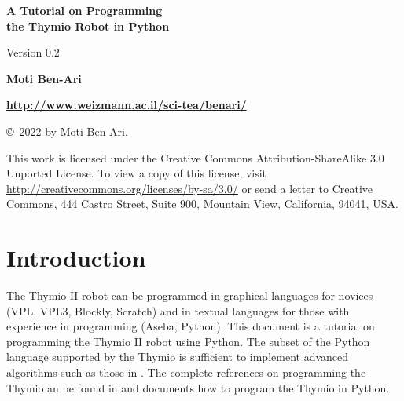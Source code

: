 \documentclass[11pt,a4paper]{article}
\begin{document}
\thispagestyle{empty}

\begin{sffamily}
\begin{center}
\begin{LARGE}
\textbf{A Tutorial on Programming\\\bigskip
the Thymio Robot in Python}
\end{LARGE}

\bigskip

Version 0.2

\begin{Large}
\bigskip\bigskip\bigskip\bigskip
\textbf{Moti Ben-Ari}
\end{Large}

\bigskip\bigskip

\textbf{\url{http://www.weizmann.ac.il/sci-tea/benari/}}

\end{center}
\end{sffamily}

\vfill

\begin{center}
\copyright{}\  2022 by Moti Ben-Ari. 
\end{center}
\begin{small}
This work is licensed under the Creative Commons Attribution-ShareAlike 3.0 Unported License. To view a copy of this license, visit \url{http://creativecommons.org/licenses/by-sa/3.0/} or send a letter to Creative Commons, 444 Castro Street, Suite 900, Mountain View, California, 94041, USA.
\end{small}

\newpage
\setcounter{tocdepth}{2}
\tableofcontents

\thispagestyle{empty}
\newpage
\setcounter{page}{1}


\section{Introduction}\label{s.introduction}

The Thymio II robot can be programmed in graphical languages for novices (VPL, VPL3, Blockly, Scratch) and in textual languages for those with experience in programming (Aseba, Python). This document is a tutorial on programming the Thymio II robot using Python. The subset of the Python language supported by the Thymio is sufficient to implement advanced algorithms such as those in \cite{elements}. The complete references on programming the Thymio an be found in \cite{thymio} and \cite{tdm} documents how to program the Thymio in Python.
\end{document}
